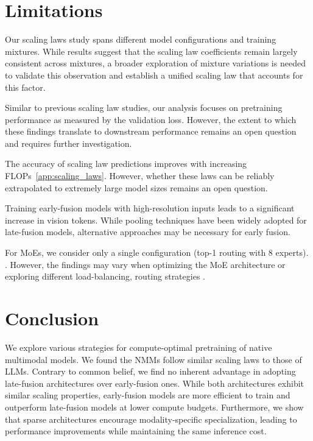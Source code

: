 

\section{Limitations} 

 Our scaling laws study
spans different model configurations and training mixtures. While results
suggest that the scaling law coefficients remain largely consistent across
mixtures, a broader exploration of mixture variations is needed to validate this
observation and establish a unified scaling law that accounts for this factor.  

 Similar to
previous scaling law studies, our analysis focuses on pretraining performance as
measured by the validation loss. However, the extent to which these findings
translate to downstream performance remains an open question and requires
further investigation.

 The accuracy of scaling law
predictions improves with increasing FLOPs~\cref{app:scaling_laws}.
 However, whether these laws can be reliably
extrapolated to extremely large model sizes remains an open question. 

 Training early-fusion
models with high-resolution inputs leads to a significant increase in vision
tokens. While pooling techniques have been widely adopted for late-fusion
models, alternative approaches may be necessary for early fusion. 

 For MoEs, we consider
only a single configuration (top-1 routing with 8 experts). . However, the findings may vary when optimizing  the
MoE architecture or exploring different load-balancing, routing strategies
.

\section{Conclusion} 
We explore various strategies for compute-optimal pretraining of native
multimodal models. We found the NMMs follow similar scaling laws to those of
LLMs. Contrary to common belief, we find no inherent advantage in adopting
late-fusion architectures over early-fusion ones. While both architectures
exhibit similar scaling properties, early-fusion models are more efficient to
train and outperform late-fusion models at lower compute budgets. Furthermore,
we show that sparse architectures encourage modality-specific specialization,
leading to performance improvements while maintaining the same inference cost.




